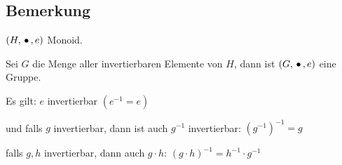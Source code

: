  
 \subsection{Bemerkung}
 
 $(H, \,{\bullet}\,, e)$ Monoid.
 
 Sei $G$ die Menge aller invertierbaren Elemente von $H$, dann ist $(G, \,{\bullet}\,, e)$ eine Gruppe.
 
 Es gilt: $e$ invertierbar $(e^{-1} = e)$
 
 und falls $g$ invertierbar, dann ist auch $g^{-1}$ invertierbar: $(g^{-1})^{-1} = g$
 
 falls $g, h$ invertierbar, dann auch $g \cdot h$: \quad
 $(g \cdot h)^{-1} = h^{-1} \cdot g^{-1} $
 
 
 
 
 
 
 
